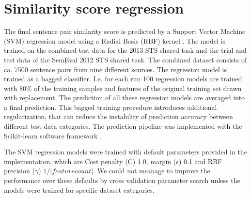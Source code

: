 
\section{Similarity score regression}
\label{sec:regression}

The final sentence pair similarity score is predicted by a Support Vector Machine (SVM) regression model using a Radial Basis (RBF) kernel \cite{VapnikEA:97}. The model is trained on the combined test data for the 2013 STS shared task and the trial and test data of the SemEval 2012 STS shared task. The combined dataset consists of ca. 7500 sentence pairs from nine different sources. The regression model is trained as a bagged classifier. I.e. for each run 100 regression models are trained with 80\% of the training samples and features of the original training set drawn with replacement. The prediction of all these regression models are averaged into a final prediction. This bagged training procedure introduces additional regularization, that can  reduce the instability of prediction accuracy between different test data categories. The prediction pipeline was implemented with the Scikit-learn software framework \cite{scikit-learn}.

The SVM regression models were trained with default parameters provided in the implementation, which are Cost penalty (C) 1.0, margin ($\epsilon$) 0.1 and RBF precision ($\gamma$) $1/|feature count|$. We could not msanage to improve the performance over these defaults by cross validation parameter search unless the models were trained for specific dataset categories.

